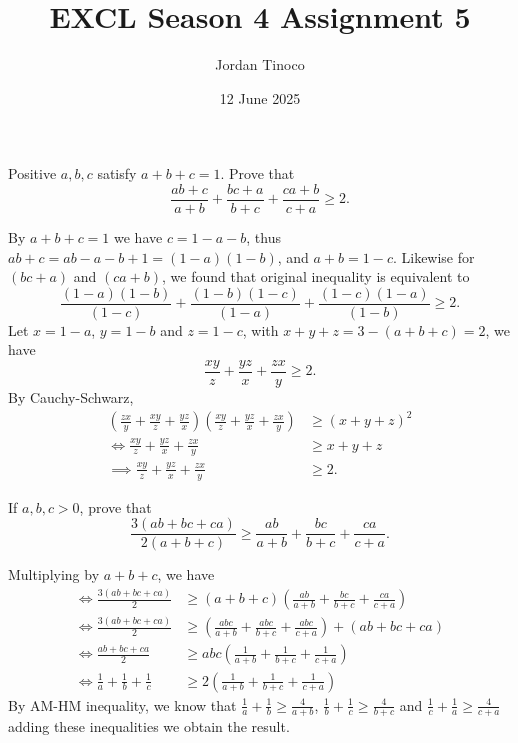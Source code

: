 \documentclass[12pt, paper=letter]{scrartcl}
\title {\Large EXCL Season 4 Assignment 5}
\date{12 June 2025}
\author{Jordan Tinoco}
\begin{document}
    \maketitle

    \begin{problem*}
        Positive $a,b,c$ satisfy $a + b + c = 1$.
        Prove that
        \[
            \frac{ab + c}{a + b} + \frac{bc + a}{b + c} + \frac{ca + b}{c + a} \geq 2.
        \]
    \end{problem*}
    \begin{solution*}
        By $a + b + c = 1$ we have $c = 1 - a - b$, thus $ab + c = ab - a - b + 1 = (1 - a)(1 - b)$, and $a + b = 1 - c$.
        Likewise for $(bc + a)$ and $(ca + b)$, we found that original inequality is equivalent to
        \[
            \frac{(1 - a)(1 - b)}{(1 - c)} + \frac{(1 - b)(1 - c)}{(1 - a)} + \frac{(1 - c)(1 - a)}{(1 - b)} \geq 2.
        \]
        Let $x = 1 - a$, $y = 1 - b$ and $z = 1 - c$, with $x + y + z = 3 - (a + b + c) = 2$, we have
        \[
            \frac{xy}{z} + \frac{yz}{x} + \frac{zx}{y} \geq 2.
        \]
        By Cauchy-Schwarz,
        \begin{align*}
            \left(\frac{zx}{y} + \frac{xy}{z} + \frac{yz}{x}\right)\left(\frac{xy}{z} + \frac{yz}{x} + \frac{zx}{y}\right) &\geq (x + y + z)^2\\[3mm]
            \iff \frac{xy}{z} + \frac{yz}{x} + \frac{zx}{y} &\geq x + y + z\\[2mm]
            \implies \frac{xy}{z} + \frac{yz}{x} + \frac{zx}{y} &\geq 2.
        \end{align*}
    \end{solution*}

    \begin{problem*}
        If $a,b,c > 0$, prove that
        \[
            \frac{3(ab + bc + ca)}{2(a + b + c)} \geq \frac{ab}{a + b} + \frac{bc}{b + c} + \frac{ca}{c + a}.
        \]
    \end{problem*}
    \begin{solution*}
        Multiplying by $a + b + c$, we have
        \begin{align*}
            \iff \frac{3(ab + bc + ca)}{2} &\geq (a + b + c)\left(\frac{ab}{a + b} + \frac{bc}{b + c} + \frac{ca}{c + a}\right)\\[3mm]
            \iff \frac{3(ab + bc + ca)}{2} &\geq \left(\frac{abc}{a + b} + \frac{abc}{b + c} + \frac{abc}{c + a}\right) + (ab + bc + ca)\\[3mm]
            \iff \frac{ab + bc + ca}{2} &\geq abc\left(\frac{1}{a + b} + \frac{1}{b + c} + \frac{1}{c + a}\right)\\[3mm]
            \iff \frac{1}{a} + \frac{1}{b} + \frac{1}{c} &\geq 2\left(\frac{1}{a + b} + \frac{1}{b + c} + \frac{1}{c + a}\right)
        \end{align*}
        By AM-HM inequality, we know that $\frac{1}{a} + \frac{1}{b} \geq \frac{4}{a + b}$, $\frac{1}{b} + \frac{1}{c} \geq \frac{4}{b + c}$ and $\frac{1}{c} + \frac{1}{a} \geq \frac{4}{c + a}$ adding these inequalities we obtain the result.
    \end{solution*}
    
\end{document}

